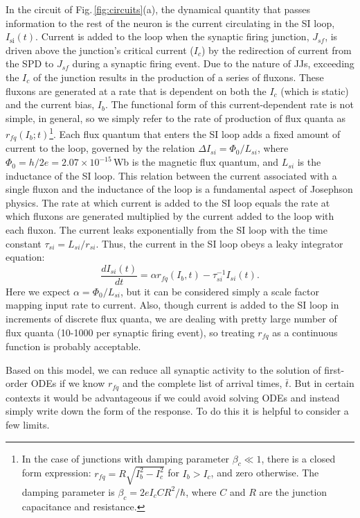 \documentclass[]{article}
\begin{document}
In the circuit of Fig.\,\ref{fig:circuits}(a), the dynamical quantity that passes information to the rest of the neuron is the current circulating in the SI loop, $I_{\mathrm{si}}(t)$. Current is added to the loop when the synaptic firing junction, $J_{sf}$, is driven above the junction's critical current ($I_c$) by the redirection of current from the SPD to $J_{sf}$ during a synaptic firing event. Due to the nature of JJs, exceeding the $I_c$ of the junction results in the production of a series of fluxons. These fluxons are generated at a rate that is dependent on both the $I_c$ (which is static) and the current bias, $I_b$. The functional form of this current-dependent rate is not simple, in general, so we simply refer to the rate of production of flux quanta as $r_{fq}(I_b;t)$\footnote{In the case of junctions with damping parameter $\beta_c\ll 1$, there is a closed form expression: $r_{fq} = R\sqrt{I_b^2-I_c^2}$ for $I_b > I_c$, and zero otherwise. The damping parameter is $\beta_c = 2eI_cCR^2/\hbar$, where $C$ and $R$ are the junction capacitance and resistance.}. Each flux quantum that enters the SI loop adds a fixed amount of current to the loop, governed by the relation $\Delta I_{si} = \Phi_0/L_{si}$, where $\Phi_{0} = h/2e = 2.07\times 10^{-15}$\,Wb is the magnetic flux quantum, and $L_{si}$ is the inductance of the SI loop. This relation between the current associated with a single fluxon and the inductance of the loop is a fundamental aspect of Josephson physics. The rate at which current is added to the SI loop equals the rate at which fluxons are generated multiplied by the current added to the loop with each fluxon. The current leaks exponentially from the SI loop with the time constant $\tau_{si} = L_{si}/r_{si}$. Thus, the current in the SI loop obeys a leaky integrator equation:
\begin{equation}
\label{eq:leaky_integrator__SI_loop}
\frac{dI_{si}(t)}{dt} = \alpha r_{fq}(I_b,t)-\tau_{si}^{-1}I_{si}(t).
\end{equation}
Here we expect $\alpha = \Phi_0/L_{si}$, but it can be considered simply a scale factor mapping input rate to current. Also, though current is added to the SI loop in increments of discrete flux quanta, we are dealing with pretty large number of flux quanta (10-1000 per synaptic firing event), so treating $r_{fq}$ as a continuous function is probably acceptable.

Based on this model, we can reduce all synaptic activity to the solution of first-order ODEs if we know $r_{fq}$ and the complete list of arrival times, $\bar{t}$. But in certain contexts it would be advantageous if we could avoid solving ODEs and instead simply write down the form of the response. To do this it is helpful to consider a few limits.
\end{document}
